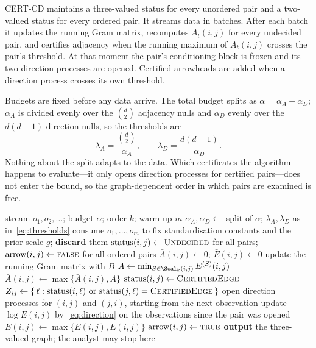 CERT-CD maintains a three-valued status for every unordered pair and a
two-valued status for every ordered pair. It streams data in batches. After
each batch it updates the running Gram matrix, recomputes $A_t(i,j)$ for every
undecided pair, and certifies adjacency when the running maximum of $A_t(i,j)$
crosses the pair's threshold. At that moment the pair's conditioning block is
frozen and its two direction processes are opened. Certified arrowheads are
added when a direction process crosses its own threshold.

Budgets are fixed before any data arrive. The total budget splits as
$\alpha = \alpha_A + \alpha_D$; $\alpha_A$ is divided evenly over the
$\binom{d}{2}$ adjacency nulls and $\alpha_D$ evenly over the $d(d-1)$
direction nulls, so the thresholds are
\begin{equation}\label{eq:thresholds}
\lambda_A = \frac{\binom{d}{2}}{\alpha_A},
\qquad
\lambda_D = \frac{d(d-1)}{\alpha_D}.
\end{equation}
Nothing about the split adapts to the data. Which certificates the algorithm
happens to evaluate---it only opens direction processes for certified
pairs---does not enter the bound, so the graph-dependent order in which pairs
are examined is free.

\begin{algorithm}[t]
\caption{CERT-CD}\label{alg:certcd}
\begin{algorithmic}[1]
\Require stream $o_1, o_2, \dots$; budget $\alpha$; order $k$; warm-up $m$
\State $\alpha_A, \alpha_D \gets$ split of $\alpha$;
       $\lambda_A, \lambda_D$ as in~\eqref{eq:thresholds}
\State consume $o_1,\dots,o_m$ to fix standardisation constants and the prior
       scale $g$; \textbf{discard} them
\State $\mathrm{status}(i,j) \gets \textsc{Undecided}$ for all pairs;
       $\mathrm{arrow}(i,j) \gets \textsc{false}$ for all ordered pairs
\State $\bar A(i,j) \gets 0$; $\bar E(i,j) \gets 0$
  \State update the running Gram matrix with $B$
    \State $A \gets \min_{S \in \Scal_k(i,j)} E^{(S)}(i,j)$
    \State $\bar A(i,j) \gets \max\{\bar A(i,j), A\}$
      \State $\mathrm{status}(i,j) \gets \textsc{CertifiedEdge}$
      \State $Z_{ij} \gets \{\,\ell : \mathrm{status}(i,\ell) \text{ or }
             \mathrm{status}(j,\ell) = \textsc{CertifiedEdge} \,\}$
      \State open direction processes for $(i,j)$ and $(j,i)$, starting from
             the next observation
    \EndIf
  \EndFor
    \State update $\log E(i,j)$ by~\eqref{eq:direction} on the observations
           since the pair was opened
    \State $\bar E(i,j) \gets \max\{\bar E(i,j), E(i,j)\}$
     $\mathrm{arrow}(i,j) \gets \textsc{true}$
    \EndIf
  \EndFor
  \State \textbf{output} the three-valued graph; the analyst may stop here
\EndFor
\end{algorithmic}
\end{algorithm}

